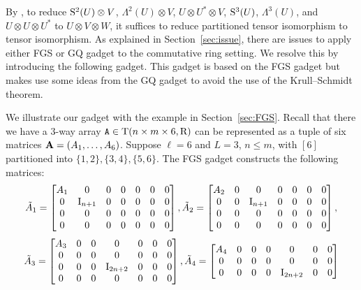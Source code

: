 By \cite{FGS19}, to reduce $\S^2(U)\otimes V$, $\Lambda^2(U)\otimes V$, $U\otimes U^*\otimes V$, $\S^3(U)$, $\Lambda^3(U)$, and $U\otimes U\otimes U^*$ to $U\otimes V\otimes W$, it suffices to reduce partitioned tensor isomorphism to tensor isomorphism. As explained in Section~\ref{sec:issue}, there are issues to apply either FGS or GQ gadget to the commutative ring setting. We resolve this by introducing the following gadget. This gadget is based on the FGS gadget but makes use some ideas from the GQ gadget to avoid the use of the Krull--Schmidt theorem.

\begin{example}\label{ex:hybrid}
We illustrate our gadget with the example in Section~\ref{sec:FGS}. Recall that there we have 
a $3$-way array $\tA\in\T(n\times m\times 6, \rng)$ can be represented as a tuple of six matrices $\vA=(A_1, \dots, A_6)$. Suppose $\ell=6$ and $L=3$, $n\leq m$, with $[6]$ partitioned into $\{1, 2\}, \{3, 4\}, \{5, 6\}$. The FGS gadget constructs the following matrices: 
\[\tilde A_1=\begin{bmatrix}
	A_1 & 0 & 0 & 0 & 0 & 0 & 0 \\
	0 & \idmat_{n+1} & 0 & 0 & 0 & 0 & 0 \\
	0 & 0 & 0 & 0 & 0 & 0 & 0 \\
	0 & 0 & 0 & 0 & 0 & 0 & 0 \\
\end{bmatrix}, 
\tilde A_2=\begin{bmatrix}
	A_ 2& 0 & 0 & 0 & 0 & 0 & 0 \\
	0 & 0 & \idmat_{n+1} & 0 & 0 & 0 & 0 \\
	0 & 0 & 0 & 0 & 0 & 0 & 0 \\
	0 & 0 & 0 & 0 & 0 & 0 & 0 \\
\end{bmatrix},\]
\[
\tilde A_3=\begin{bmatrix}
	A_3 & 0 & 0 & 0 & 0 & 0 & 0 \\
	0 & 0 & 0 & 0 & 0 & 0 & 0 \\
	0 & 0 & 0 & \idmat_{2n+2} & 0 & 0 & 0 \\
	0 & 0 & 0 & 0 & 0 & 0 & 0 \\
\end{bmatrix},
\tilde A_4=\begin{bmatrix}
	A_4 & 0 & 0 & 0 & 0 & 0 & 0 \\
	0 & 0 & 0 & 0 & 0 & 0 & 0 \\
	0 & 0 & 0 & 0 & \idmat_{2n+2} & 0 & 0 \\

\end{bmatrix}\]
\end{example}
